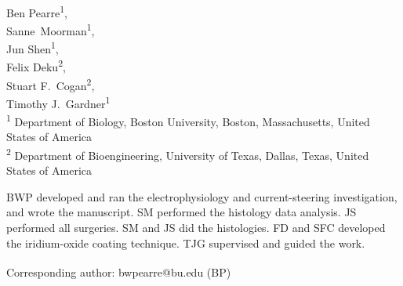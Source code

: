 \documentclass[10pt,letterpaper]{article}
\date{}
\begin{document}
\vspace*{0.35in}

\begin{flushleft}
{\Large
  \textbf{}
}
\newline
\\
Ben Pearre\textsuperscript{1\textcurrency},\\
Sanne~Moorman\textsuperscript{1},\\
Jun Shen\textsuperscript{1},\\
Felix Deku\textsuperscript{2},\\
Stuart F.~Cogan\textsuperscript{2},\\
Timothy J.~Gardner\textsuperscript{1}
\\
\bigskip
\textsuperscript{1} Department of Biology, Boston University, Boston, Massachusetts, United States of America\\
\textsuperscript{2} Department of Bioengineering, University of Texas, Dallas, Texas, United States of America
\\
\bigskip

% 
%
BWP developed and ran the electrophysiology and current-steering investigation, and wrote the manuscript.  SM performed the histology data analysis. JS performed all surgeries.  SM and JS did the histologies.  FD and SFC developed the iridium-oxide coating technique.  TJG supervised and guided the work.





\textsuperscript{\textcurrency} Corresponding author: bwpearre@bu.edu (BP)

\end{flushleft}
\end{document}
